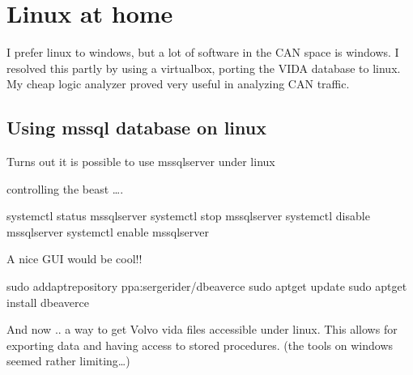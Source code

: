 \documentclass[letterpaper,10pt,english]{sphinxmanual}
\begin{document}
\chapter{Linux at home}
\label{\detokenize{linux/index:linux-at-home}}\label{\detokenize{linux/index::doc}}
\sphinxAtStartPar
I prefer linux to windows, but a lot of software in the CAN space is windows.
I resolved this partly by using a virtualbox, porting the VIDA database to linux.
My cheap logic analyzer proved very useful in analyzing CAN traffic.


\section{Using mssql database on linux}
\label{\detokenize{linux/rebuild-database:using-mssql-database-on-linux}}\label{\detokenize{linux/rebuild-database::doc}}
\sphinxAtStartPar
Turns out it is possible to use ms\sphinxhyphen{}sqlserver under linux

\sphinxAtStartPar
{}

\sphinxAtStartPar
controlling the beast ….

\begin{sphinxVerbatim}[commandchars=\\\{\}]
systemctl status mssql\PYGZhy{}server
systemctl stop mssql\PYGZhy{}server
systemctl disable mssql\PYGZhy{}server
systemctl enable mssql\PYGZhy{}server
\end{sphinxVerbatim}

\sphinxAtStartPar
A nice GUI would be cool!!

\sphinxAtStartPar
{}
sudo add\sphinxhyphen{}apt\sphinxhyphen{}repository ppa:serge\sphinxhyphen{}rider/dbeaver\sphinxhyphen{}ce
sudo apt\sphinxhyphen{}get update
sudo apt\sphinxhyphen{}get install dbeaver\sphinxhyphen{}ce

\sphinxAtStartPar
And now .. a way to get Volvo vida files accessible under linux.
This allows for exporting data and having access to stored procedures. (the tools on windows seemed rather limiting…)
\end{document}
